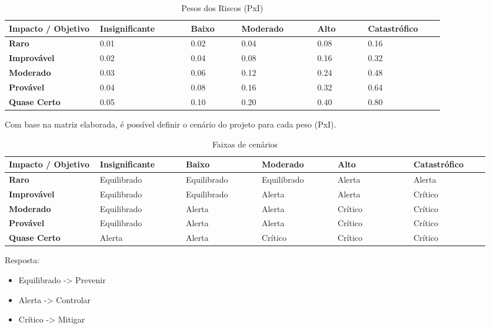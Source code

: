 \begin{apendicesenv}
\begin{table}[htp]
    \centering
    \caption{Pesos dos Riscos (PxI)}
    \label{my-label}
    \begin{tabular}{|p{0.18\linewidth}|p{0.18\linewidth}|p{0.10\linewidth}|p{0.15\linewidth}|p{0.10\linewidth}|p{0.15\linewidth}|}
    \hline
    \textbf{Impacto / Objetivo} & \textbf{Insignificante} & \textbf{Baixo} & \textbf{Moderado} & \textbf{Alto} & \textbf{Catastrófico} \\ \hline
    \textbf{Raro} & 0.01 & 0.02 & 0.04 & 0.08 & 0.16 \\ \hline
    \textbf{Improvável} & 0.02 & 0.04 & 0.08 & 0.16 & 0.32 \\ \hline
    \textbf{Moderado} & 0.03 & 0.06 & 0.12 & 0.24 & 0.48 \\ \hline
    \textbf{Provável} & 0.04 & 0.08 & 0.16 & 0.32 & 0.64 \\ \hline
    \textbf{Quase Certo} & 0.05 & 0.10 & 0.20 & 0.40 & 0.80 \\ \hline
    \end{tabular}
\end{table}

Com base na matriz elaborada, é possível definir o cenário do projeto para cada peso (PxI).

\begin{table}[htp]
    \centering
    \caption{Faixas de cenários}
    \label{my-label}
    \begin{tabular}{|p{0.18\linewidth}|p{0.17\linewidth}|p{0.15\linewidth}|p{0.15\linewidth}|p{0.15\linewidth}|p{0.15\linewidth}|}
    \hline
    \textbf{Impacto / Objetivo} & \textbf{Insignificante} & \textbf{Baixo} & \textbf{Moderado} & \textbf{Alto} & \textbf{Catastrófico} \\ \hline
    \textbf{Raro} & Equilibrado & Equilibrado & Equilibrado & Alerta & Alerta \\ \hline
    \textbf{Improvável} & Equilibrado & Equilibrado & Alerta & Alerta & Crítico \\ \hline
    \textbf{Moderado} & Equilibrado & Alerta & Alerta & Crítico & Crítico \\ \hline
    \textbf{Provável} & Equilibrado & Alerta & Alerta & Crítico & Crítico \\ \hline
    \textbf{Quase Certo} & Alerta & Alerta & Crítico & Crítico & Crítico \\ \hline
    \end{tabular}
\end{table}

Resposta:
\begin{itemize}
    \item Equilibrado -> Prevenir
    \item Alerta -> Controlar
    \item Crítico -> Mitigar
\end{itemize}


\end{apendicesenv}
